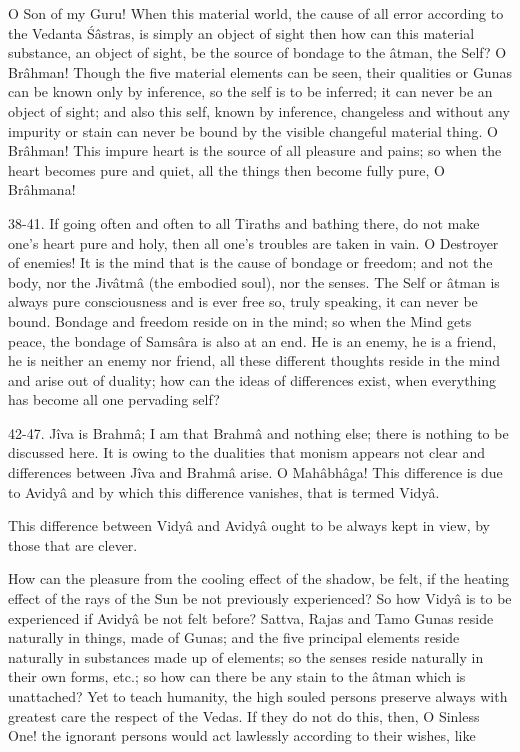 O Son of my Guru! When this material world, the cause of all error according to the Vedanta \'S\^astras, is simply an object of sight then how can this material substance, an object of sight, be the source of bondage to the \^atman, the Self? O Br\^ahman! Though the five material elements can be seen, their qualities or Gunas can be known only by inference, so the self is to be inferred; it can never be an object of sight; and also this self, known by inference, changeless and without any impurity or stain can never be bound by the visible changeful material thing. O Br\^ahman! This impure heart is the source of all pleasure and pains; so when the heart becomes pure and quiet, all the things then become fully pure, O Br\^ahmana!

38-41. If going often and often to all Tiraths and bathing there, do not make one's heart pure and holy, then all one's troubles are taken in vain. O Destroyer of enemies! It is the mind that is the cause of bondage or freedom; and not the body, nor the Jiv\^atm\^a (the embodied soul), nor the senses. The Self or \^atman is always pure consciousness and is ever free so, truly speaking, it can never be bound. Bondage and freedom reside on in the mind; so when the Mind gets peace, the bondage of Sams\^ara is also at an end. He is an enemy, he is a friend, he is neither an enemy nor friend, all these different thoughts reside in the mind and arise out of duality; how can the ideas of differences exist, when everything has become all one pervading self?

42-47. J\^iva is Brahm\^a; I am that Brahm\^a and nothing else; there is nothing to be discussed here. It is owing to the dualities that monism appears not clear and differences between J\^iva and Brahm\^a arise. O Mah\^abh\^aga! This difference is due to Avidy\^a and by which this difference vanishes, that is termed Vidy\^a.

This difference between Vidy\^a and Avidy\^a ought to be always kept in view, by those that are clever.

How can the pleasure from the cooling effect of the shadow, be felt, if the heating effect of the rays of the Sun be not previously experienced? So how Vidy\^a is to be experienced if Avidy\^a be not felt before? Sattva, Rajas and Tamo Gunas reside naturally in things, made of Gunas; and the five principal elements reside naturally in substances made up of elements; so the senses reside naturally in their own forms, etc.; so how can there be any stain to the \^atman which is unattached? Yet to teach humanity, the high souled persons preserve always with greatest care the respect of the Vedas. If they do not do this, then, O Sinless One! the ignorant persons would act lawlessly according to their wishes, like

